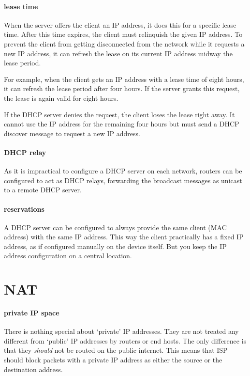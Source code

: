 \paragraph{lease time}
When the server offers the client an \acs{IP} address, it does this for a specific lease time.
After this time expires, the client must relinquish the given \acs{IP} address.
To prevent the client from getting disconnected from the network while it requests a new \acs{IP} address, it can refresh the lease on its current \acs{IP} address midway the lease period.

For example, when the client gets an \acs{IP} address with a lease time of eight hours, it can refresh the lease period after four hours.
If the server grants this request, the lease is again valid for eight hours.

If the \acs{DHCP} server denies the request, the client loses the lease right away.
It cannot use the \acs{IP} address for the remaining four hours but must send a \acs{DHCP} discover message to request a new \acs{IP} address.

\paragraph{\acs{DHCP} relay}
As it is impractical to configure a \acs{DHCP} server on each network, routers can be configured to act as \acs{DHCP} relays, forwarding the broadcast messages%
as unicast to a remote \acs{DHCP} server.

\paragraph{reservations}
A \acs{DHCP} server can be configured to always provide the same client (\acs{MAC} address) with the same \acs{IP} address.
This way the client practically has a fixed \acs{IP} address, as if configured manually on the device itself.
But you keep the \acs{IP} address configuration on a central location.




\section{\Acl{NAT}}
\label{sec:ip-nat}


\paragraph{private \acs{IP} space}
There is nothing special about `private' \acs{IP} addresses.
They are not treated any different from `public' \acs{IP} addresses by routers or end hosts.
The only difference is that they \emph{should} not be routed on the public internet.
This means that \acl{ISP} should block packets with a private \acs{IP} address as either the source or the destination address.

